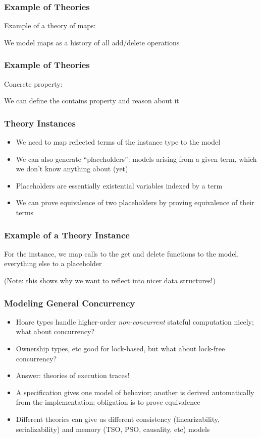 \documentclass{beamer}
\begin{document}
\begin{frame}
  \frametitle{Example of Theories}

  Example of a theory of maps:
  \lstset{language=haskell, basicstyle=\ttfamily\scriptsize}
  
  We model maps as a history of all add/delete operations
\end{frame}

\begin{frame}
  \frametitle{Example of Theories}

  Concrete property:
  \lstset{language=haskell, basicstyle=\ttfamily\scriptsize}
  
  We can define the contains property and reason about it
\end{frame}

\begin{frame}
  \frametitle{Theory Instances}
  \begin{itemize}
    \item We need to map reflected terms of the instance type to the model
    \item We can also generate ``placeholders'': models arising from a
      given term, which we don't know anything about (yet)
    \item Placeholders are essentially existential variables indexed
      by a term
    \item We can prove equivalence of two placeholders by proving
      equivalence of their terms
  \end{itemize}
\end{frame}

\begin{frame}
  \frametitle{Example of a Theory Instance}

  For the instance, we map calls to the get and delete functions to
  the model, everything else to a placeholder
  \lstset{language=haskell, basicstyle=\ttfamily\scriptsize}
  
  (Note: this shows why we want to reflect into nicer data structures!)
\end{frame}

\begin{frame}
  \frametitle{Modeling General Concurrency}
  \begin{itemize}
    \item Hoare types handle higher-order \emph{non-concurrent}
      stateful computation nicely; what about concurrency?
    \item Ownership types, etc good for lock-based, but what about
      lock-free concurrency?
    \item Answer: theories of execution traces!
    \item A specification gives one model of behavior; another is
      derived automatically from the implementation; obligation is to
      prove equivalence
    \item Different theories can give us different consistency
      (linearizability, serializability) and memory (TSO, PSO,
      causality, etc) models
  \end{itemize}
\end{frame}
\end{document}
